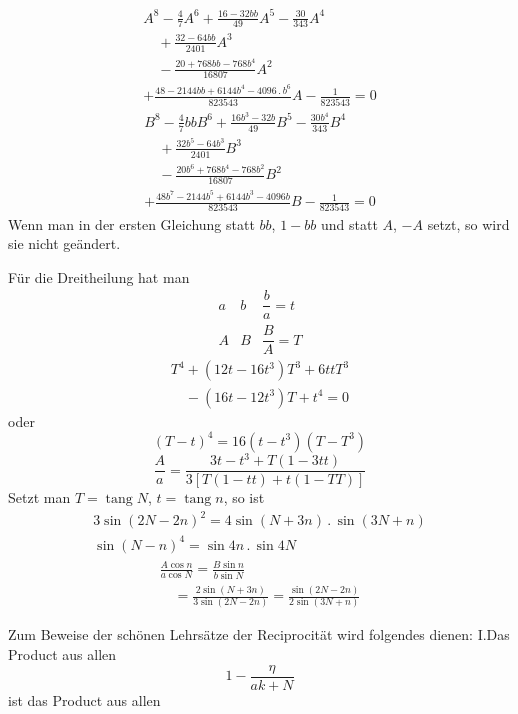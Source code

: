\[
\begin{gathered}
A^8-\tfrac47A^6+\frac{16-32bb}{49}A^5-\frac{30}{343}A^4
\\[7pt]\quad{}+\frac{32-64bb}{2401}A^3
\\[7pt]\quad{}-\frac{20+768bb-768b^4}{16807}A^2\\[7pt]
+\frac{48-2144bb+6144b^4-4096\mathbin{.}b^6}{823543}A
-\frac1{823543}=0
\end{gathered}
\]
\[
\begin{gathered}
B^8-\tfrac47bbB^6+\frac{16b^3-32b}{49}B^5-\frac{30b^4}{343}B^4
\\[7pt]\quad{}+\frac{32b^5-64b^3}{2401}B^3
\\[7pt]\quad{}-\frac{20b^6+768b^4-768b^2}{16807}B^2\\[7pt]
+\frac{48b^7-2144b^5+6144b^3-4096b}{823543}B
-\frac1{823543}=0
\end{gathered}
\]
Wenn man in der ersten Gleichung statt $bb$, $1-bb$ und statt $A$, $-A$ 
setzt, so wird sie nicht geändert.

Für die Dreitheilung hat man
\[
\begin{array}{ccc}
a&b&\dfrac ba=t\\[5pt]
A&B&\dfrac BA=T
\end{array}
\]
\[
\begin{gathered}T^4+(12t-16t^3)T^3+6ttT^3\\[7pt]\quad{}-(16t-12t^3)T+t^4=0\end{gathered}
\]
oder
\[
(T-t)^4=16(t-t^3)(T-T^3)
\]
\[
\frac Aa=\frac{3t-t^3+T(1-3tt)}{3[T(1-tt)+t(1-TT)]}
\]
Setzt man $T=\operatorname{tang}N$, $t=\operatorname{tang}n$, so ist
\[
\begin{gathered}
3\sin(2N-2n)^2=4\sin(N+3n)\mathbin{.}\sin(3N+n)\\[7pt]
\sin(N-n)^4=\sin4n\mathbin{.}\sin4N
\end{gathered}
\]
\[
\begin{gathered}\frac{A\cos n}{a\cos N}=\frac{B\sin n}{b\sin N}
\\[7pt]\quad{}=\frac{2\sin(N+3n)}{3\sin(2N-2n)}
=\frac{\sin(2N-2n)}{2\sin(3N+n)}\end{gathered}
\]

Zum Beweise der schönen Lehrsätze der Reciprocität wird folgendes dienen: 
I.\quad Das Product aus allen
\[
1-\frac{\eta}{ak+N}
\]
ist das Product aus allen
